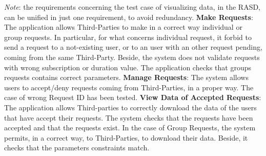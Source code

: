 \documentclass[a4paper]{article}
\begin{document}
\textit{Note}: the requirements concerning the test case of visualizing data, in the RASD, can be unified in just one requirement, to avoid redundancy.\newline
 \newline\newline
\textbf{Make Requests}:\newline
The application allows Third-Parties to make in a correct way individual or group requests.\newline
In particular, for what concerns individual request, it forbid  to send a request to a not-existing user, or to an user with an other request pending, coming from the same Third-Party. Beside, the system does not validate requests with wrong subscription or duration value.\newline
The application checks that groups requests contains correct parameters.
\newline\newline
\textbf{Manage Requests}:\newline
The system allows users to accept/deny requests coming from Third-Parties, in a proper way. The case of wrong Request ID has been tested.
\newline\newline
\textbf{View Data of Accepted Requests}:\newline
The application allows Third-parties to correctly download the data of the users that have accept their requests. The system checks that the requests have been accepted and that the requests exist.
In the case of Group Requests, the system permits, in a correct way, to Third-Parties, to download their data. Beside, it checks that the parameters constraints match. 







\


\newpage
\end{document}
